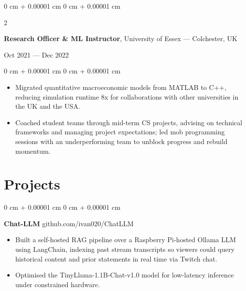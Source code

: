 \documentclass[6pt, letterpaper]{article}
\newenvironment{highlights}{
    \begin{itemize}[
        topsep=0.03 cm,
        parsep=0.03 cm,
        partopsep=0pt,
        itemsep=0pt,
        leftmargin=0 cm + 10pt
    ]
}{
    \end{itemize}
} %
\newenvironment{onecolentry}{
    \begin{adjustwidth}{
        0 cm + 0.00001 cm
    }{
        0 cm + 0.00001 cm
    }
}{
    \end{adjustwidth}
} %
\newenvironment{twocolentry}[2][]{
    \onecolentry
    \def\secondColumn{#2}
    \setcolumnwidth{\fill, 4.5 cm}
    \begin{paracol}{2}
}{
    \switchcolumn \raggedleft \secondColumn
    \end{paracol}
    \endonecolentry
} %
\begin{document}
        \begin{twocolentry}{Oct 2021 --- Dec 2022}
        \textbf{Research Officer \& ML Instructor}, University of Essex --- Colchester, UK
        \end{twocolentry}

        \begin{onecolentry}
        \begin{highlights}
        \item Migrated quantitative macroeconomic models from MATLAB to C++, reducing simulation runtime 8x for collaborations with other universities in the UK and the USA.
        \item Coached student teams through mid-term CS projects, advising on technical frameworks and managing project expectations; led mob programming sessions with an underperforming team to unblock progress and rebuild momentum.
        \end{highlights}
        \end{onecolentry}


    \section{Projects}

    \begin{onecolentry}
        \textbf{Chat-LLM} \hfill github.com/ivan020/ChatLLM

        \begin{highlights}

            \item Built a self-hosted RAG pipeline over a Raspberry Pi-hosted Ollama LLM using LangChain, indexing past stream transcripts so viewers could query historical content and prior statements in real time via Twitch chat. 
            \item Optimised the TinyLlama-1.1B-Chat-v1.0 model for low-latency inference under constrained hardware.

        \end{highlights}
    \end{onecolentry}
\end{document}
